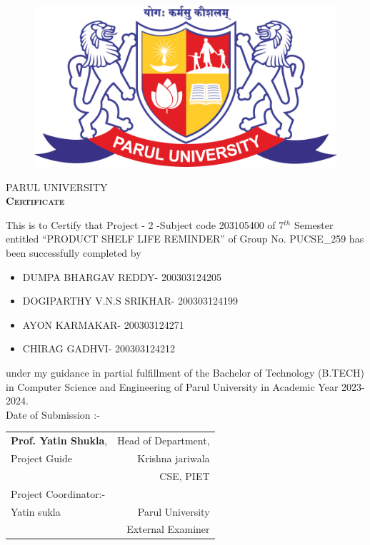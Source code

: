 \thispagestyle{plain}
\begin{figure}
    \centering
    \includegraphics[scale=0.1]{parullogo.png}
    \end{figure}
\vspace{1.5cm}
\begin{center}
    {\Huge \textsc{PARUL UNIVERSITY}}\\
   
    \vspace{1cm}
     {\Huge \bf \textsc{Certificate}}\\
     \vspace{0.5cm}
     \end{center}
     \large{This is to Certify that Project - 2 -Subject code 203105400 of 7$^{th}$ Semester entitled “PRODUCT SHELF LIFE REMINDER” of Group No. PUCSE\_259 has been successfully completed by}
     \begin{itemize}
     \centering
         \item DUMPA BHARGAV REDDY- 200303124205
         \item DOGIPARTHY V.N.S SRIKHAR- 200303124199
         \item AYON KARMAKAR- 200303124271
         \item CHIRAG GADHVI- 200303124212
     \end{itemize}
         
     \noindent
    \large {under my guidance in partial fulfillment of the Bachelor of Technology (B.TECH) in Computer Science and Engineering of Parul University in Academic Year 2023- 2024.}\\      
    Date of Submission :-
   
   \vspace{1.5cm}
   \begin{tabular}{l r}
   
      \textbf{Prof. Yatin Shukla}, & \hspace{4cm} Head of Department,  \\ 
      Project Guide & Krishna jariwala  \\  &  CSE, PIET\\
      Project Coordinator:- \\ Yatin sukla
      & Parul University\\ [7ex]  
      & External Examiner 
   \end{tabular}
   
   